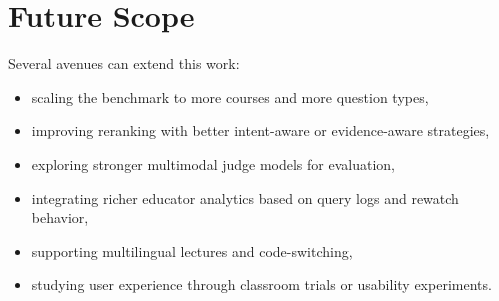 \documentclass[12pt,a4paper,oneside]{report}
\begin{document}
\section{Future Scope}
Several avenues can extend this work:
\begin{itemize}
    \item scaling the benchmark to more courses and more question types,
    \item improving reranking with better intent-aware or evidence-aware strategies,
    \item exploring stronger multimodal judge models for evaluation,
    \item integrating richer educator analytics based on query logs and rewatch behavior,
    \item supporting multilingual lectures and code-switching,
    \item studying user experience through classroom trials or usability experiments.
\end{itemize}

\clearpage
\end{document}
